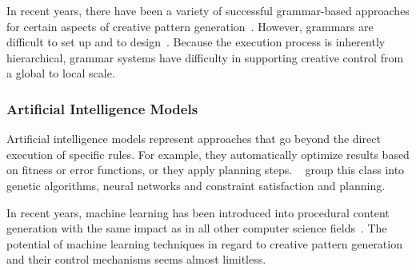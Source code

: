 In recent years, there have been a variety of successful grammar-based approaches for certain aspects of creative pattern generation~\cite{benes_2011_gpm,talton_2011_mpm,ritchie_2015_cpm}. However, grammars are difficult to set up and to design~\cite{stava_2010_ipm}. Because the execution process is inherently hierarchical, grammar systems have difficulty in supporting creative control from a global to local scale.




\subsubsection{Artificial Intelligence Models}

Artificial intelligence models represent approaches that go beyond the direct execution of specific rules. For example, they automatically optimize results based on fitness or error functions, or they apply planning steps. \citeauthor*{hendrikx_2013_pcg}~\cite{hendrikx_2013_pcg} group this class into genetic algorithms, neural networks and constraint satisfaction and planning. 

In recent years, machine learning has been introduced into procedural content generation with the same impact as in all other computer science fields~\cite{summerville_2017_pcg}. The potential of machine learning techniques in regard to creative pattern generation and their control mechanisms seems almost limitless.





